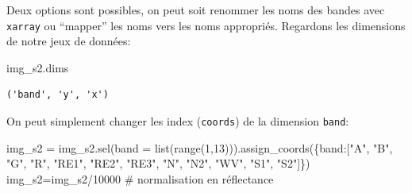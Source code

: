 \documentclass[
  11pt,
  letterpaper,
  open=any,
  twoside=false,
  french]{scrbook}
\newenvironment{Shaded}{\begin{snugshade}}{\end{snugshade}}
\newcommand{\BuiltInTok}[1]{\textcolor[rgb]{0.00,0.23,0.31}{#1}}
\newcommand{\CommentTok}[1]{\textcolor[rgb]{0.37,0.37,0.37}{#1}}
\newcommand{\DecValTok}[1]{\textcolor[rgb]{0.68,0.00,0.00}{#1}}
\newcommand{\NormalTok}[1]{\textcolor[rgb]{0.00,0.23,0.31}{#1}}
\newcommand{\OperatorTok}[1]{\textcolor[rgb]{0.37,0.37,0.37}{#1}}
\newcommand{\StringTok}[1]{\textcolor[rgb]{0.13,0.47,0.30}{#1}}
\begin{document}
Deux options sont possibles, on peut soit renommer les noms des bandes
avec \texttt{xarray} ou ``mapper'' les noms vers les noms appropriés.
Regardons les dimensions de notre jeux de données:

\begin{Shaded}
\begin{Highlighting}[]
\NormalTok{img\_s2.dims}
\end{Highlighting}
\end{Shaded}

\begin{verbatim}
('band', 'y', 'x')
\end{verbatim}

On peut simplement changer les index (\texttt{coords}) de la dimension
\texttt{band}:

\begin{Shaded}
\begin{Highlighting}[]
\NormalTok{img\_s2 }\OperatorTok{=}\NormalTok{ img\_s2.sel(band }\OperatorTok{=} \BuiltInTok{list}\NormalTok{(}\BuiltInTok{range}\NormalTok{(}\DecValTok{1}\NormalTok{,}\DecValTok{13}\NormalTok{))).assign\_coords(\{}\StringTok{\textquotesingle{}band\textquotesingle{}}\NormalTok{:[}\StringTok{"A"}\NormalTok{, }\StringTok{"B"}\NormalTok{, }\StringTok{"G"}\NormalTok{, }\StringTok{"R"}\NormalTok{, }\StringTok{"RE1"}\NormalTok{, }\StringTok{"RE2"}\NormalTok{, }\StringTok{"RE3"}\NormalTok{, }\StringTok{"N"}\NormalTok{, }\StringTok{"N2"}\NormalTok{, }\StringTok{"WV"}\NormalTok{, }\StringTok{"S1"}\NormalTok{, }\StringTok{"S2"}\NormalTok{]\})}
\NormalTok{img\_s2}\OperatorTok{=}\NormalTok{img\_s2}\OperatorTok{/}\DecValTok{10000} \CommentTok{\# normalisation en réflectance}
\end{Highlighting}
\end{Shaded}
\end{document}
